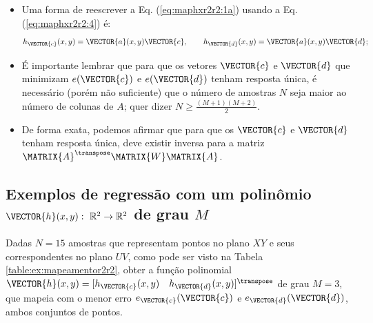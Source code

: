 \begin{tcbattention}
\begin{itemize}
\item Uma forma de reescrever a Eq. (\ref{eq:maphxr2r2:1a}) usando a Eq. (\ref{eq:maphxr2r2:4}) é:
\begin{equation}\label{eq:maphxr2r2:5}
h_{\VECTOR{c}}(x,y) = \VECTOR{a}(x,y)\VECTOR{c}, 
\qquad
h_{\VECTOR{d}}(x,y) = \VECTOR{a}(x,y)\VECTOR{d}; 
\end{equation}

\item É importante lembrar que para que os vetores $\VECTOR{c}$ e $\VECTOR{d}$
que minimizam $e(\VECTOR{c})$ e $e(\VECTOR{d})$ tenham resposta única,
é necessário (porém não suficiente) que o número de amostras $N$ seja maior ao número de colunas de $A$;
quer dizer $N\geq \frac{(M+1)(M+2)}{2}$.

\item De forma exata, podemos afirmar que para que os $\VECTOR{c}$ e  $\VECTOR{d}$ tenham resposta única,
deve existir inversa para a matriz $\MATRIX{A}^{\transpose}\MATRIX{W}\MATRIX{A}$.

\end{itemize}
\end{tcbattention}


\subsection{Exemplos de regressão com um polinômio
$\VECTOR{h}(x,y):~\mathbb{R}^2 \rightarrow \mathbb{R}^2$ de grau $M$}

\begin{example}[ Regressão do polinômio 
$\VECTOR{h}(x,y)$ de grau $M=3$, para $N=15$ amostras:]\label{ex:theo:mapeamentor2r2}
Dadas $N=15$ amostras que representam pontos no plano $XY$ e seus correspondentes 
no plano $UV$, como pode ser visto na Tabela \ref{table:ex:mapeamentor2r2},
obter a função polinomial $\VECTOR{h}(x,y)=[h_{\VECTOR{c}}(x,y)\quad h_{\VECTOR{d}}(x,y)]^{\transpose}$ de grau $M=3$,
que mapeia com o menor erro $e_{\VECTOR{c}}(\VECTOR{c})$ e $e_{\VECTOR{d}}(\VECTOR{d})$, 
ambos conjuntos de pontos.
\end{example}

